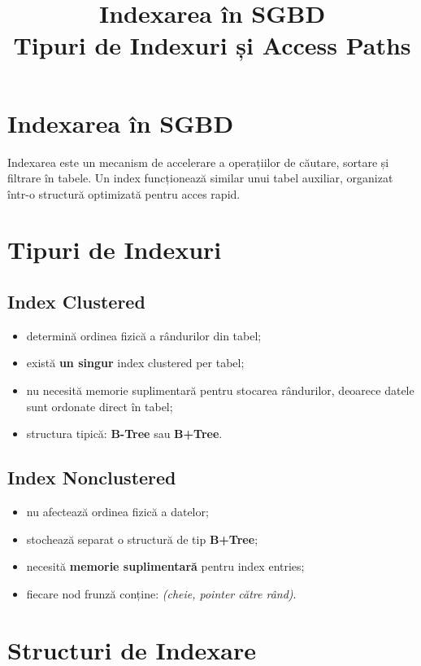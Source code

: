 \documentclass[12pt,a4paper]{article}
\title{Indexarea în SGBD \\ Tipuri de Indexuri și Access Paths}
\author{}
\date{}
\begin{document}
\maketitle

\section{Indexarea în SGBD}
Indexarea este un mecanism de accelerare a operațiilor de căutare, sortare și 
filtrare în tabele. Un index funcționează similar unui tabel auxiliar, organizat 
într-o structură optimizată pentru acces rapid.

\section{Tipuri de Indexuri}

\subsection*{Index Clustered}
\begin{itemize}[noitemsep]
    \item determină ordinea fizică a rândurilor din tabel;
    \item există \textbf{un singur} index clustered per tabel;
    \item nu necesită memorie suplimentară pentru stocarea rândurilor, deoarece 
          datele sunt ordonate direct în tabel;
    \item structura tipică: \textbf{B-Tree} sau \textbf{B+Tree}.
\end{itemize}

\subsection*{Index Nonclustered}
\begin{itemize}[noitemsep]
    \item nu afectează ordinea fizică a datelor;
    \item stochează separat o structură de tip \textbf{B+Tree};
    \item necesită \textbf{memorie suplimentară} pentru index entries;
    \item fiecare nod frunză conține: \textit{(cheie, pointer către rând)}.
\end{itemize}

\section{Structuri de Indexare}
\end{document}
